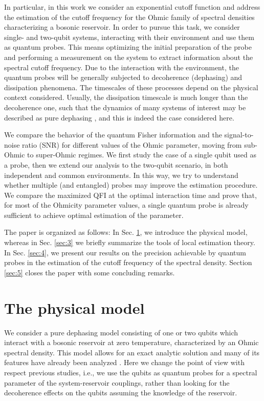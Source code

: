 \documentclass[ pra,a4paper,aps,twocolumn,superscriptaddress]{revtex4-1}
\begin{document}
\par
In particular, in this work we consider an exponential cutoff function 
and address the estimation of the cutoff frequency for the Ohmic family 
of spectral densities characterizing a bosonic reservoir. In order to pursue 
this task, we consider single- and two-qubit systems, interacting
with their environment and use them as quantum probes. This means optimizing 
the initial preparation of the probe and performing a measurement on the 
system to extract information about the spectral cutoff frequency. Due to 
the interaction with the environment, the quantum probes will be generally 
subjected to decoherence (dephasing) and dissipation phenomena. The   
timescales of these processes  depend on the physical context considered. 
Usually, the dissipation timescale is much longer than the decoherence one, 
such that the dynamics of many systems of interest may be described as pure 
dephasing \cite{benedettiDeph,addis2014}, and this is indeed the case 
considered here. 
\par
We  compare the behavior of the quantum Fisher information and the 
signal-to-noise ratio (SNR) for different values of the Ohmic parameter, 
moving from sub-Ohmic to super-Ohmic regimes. We first study the case of 
a single qubit used as a probe, then we extend our analysis to the two-qubit 
scenario, in both independent and common environments. In this way, we try 
to understand whether multiple (and entangled) probes may improve the estimation 
procedure.  We compare the maximized QFI at the optimal interaction time and 
prove that, for most of the Ohmicity parameter values, a single quantum probe is already 
sufficient to achieve optimal estimation of the parameter.
\par
The paper is organized as follows: In Sec. \ref{sec:2}, we introduce 
the physical model, whereas in Sec. \ref{sec:3} we briefly summarize 
the tools of local estimation theory. In Sec. \ref{sec:4}, we present 
our results on the precision achievable by quantum probes in the estimation 
of the cutoff frequency of the spectral density. Section \ref{sec:5} closes 
the paper with some concluding remarks.
%
\section{The physical model}\label{sec:2}
We consider a pure dephasing model consisting of one or two qubits which interact 
with a bosonic reservoir at zero temperature, characterized by an Ohmic spectral density. 
This model allows for an exact analytic solution \cite{breuer2002theory, palma96} and  
many of its features have already been analyzed  \cite{addis14, reina02,goan10, ban17, lampo17}. 
Here we change the point of view with respect previous studies, i.e., we use the qubits as  
quantum probes for a spectral parameter of the system-reservoir couplings, rather than looking
for the decoherence effects on the qubits assuming the knowledge of the reservoir.
%
\end{document}

